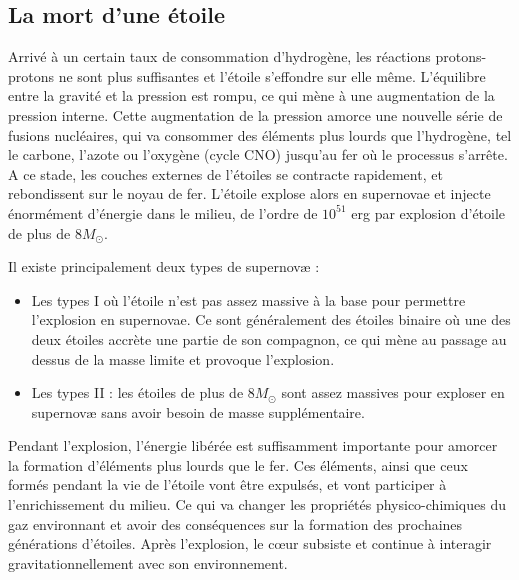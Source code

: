 \subsection{La mort d'une étoile}
\label{sec:snmort}

Arrivé à un certain taux de consommation d'hydrogène, les réactions protons-protons ne sont plus suffisantes et l'étoile s'effondre sur elle même.
L'équilibre entre la gravité et la pression est rompu, ce qui mène à une augmentation de la pression interne.
Cette augmentation de la pression amorce une nouvelle série de fusions nucléaires, qui va consommer des éléments plus lourds que l’hydrogène, tel le carbone, l'azote ou l'oxygène (cycle CNO) jusqu'au fer où le processus s'arrête.
A ce stade, les couches externes de l'étoiles se contracte rapidement, et rebondissent sur le noyau de fer.
L'étoile explose alors en supernovae et injecte énormément d'énergie dans le milieu, de l'ordre de $10^{51}$ erg par explosion d'étoile de plus de $8 M_\odot$. 

Il existe principalement deux types de supernovæ : 
\begin{itemize}
\item Les types I où l'étoile n'est pas assez massive à la base pour permettre l'explosion en supernovae.
Ce sont généralement des étoiles binaire où une des deux étoiles accrète une partie de son compagnon, ce qui mène au passage au dessus de la masse limite et provoque l'explosion.
\item Les types II : les étoiles de plus de $8 M_\odot$ sont assez massives pour exploser en supernovæ sans avoir besoin de masse supplémentaire.
\end{itemize}

Pendant l'explosion, l'énergie libérée est suffisamment importante pour amorcer la formation d'éléments plus lourds que le fer.
Ces éléments, ainsi que ceux formés pendant la vie de l'étoile vont être expulsés, et vont participer à l'enrichissement du milieu.
Ce qui va changer les propriétés physico-chimiques du gaz environnant et avoir des conséquences sur la formation des prochaines générations d'étoiles.
Après l'explosion, le cœur subsiste et continue à interagir gravitationnellement avec son environnement.



